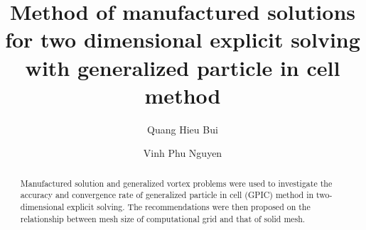 \documentclass[preprint,3p,12pt]{elsarticle}
\begin{document}
\begin{frontmatter}



\title{\textbf{Method of manufactured solutions for two dimensional explicit solving with generalized particle in cell method}}


\author[1]{Quang Hieu Bui}
\author[2]{Vinh Phu Nguyen}


\address[1]{Faculty of Civil Engineering, The University of Danang-University of Science and Technology, 54 Nguyen Luong Bang, Danang, Vietnam}
\address[2]{Department of Civil Engineering, Monash University, Clayton 3800, VIC, Australia}


\begin{abstract}
Manufactured solution and generalized vortex problems were used to investigate the accuracy and convergence rate of generalized particle in cell (GPIC) method in two-dimensional explicit solving. The recommendations were then proposed on the relationship between mesh size of computational grid and  that of solid mesh.


\end{abstract}
\end{frontmatter}
\end{document}
